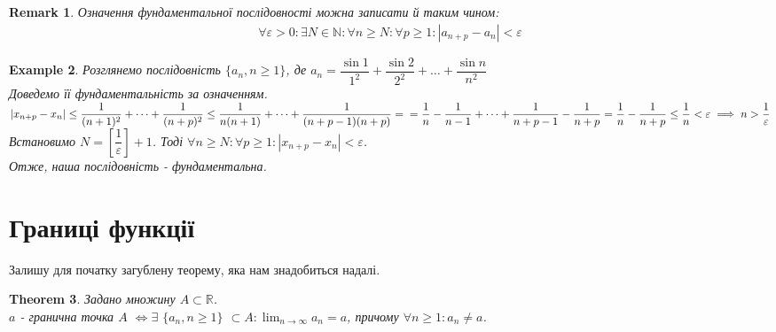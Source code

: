 \documentclass[a4paper, 14pt]{article}
\def\huge{\displaystyle}
\theoremstyle{theoremdd}
\newtheorem{theorem}{Theorem}[subsection]
\theoremstyle{theoremdd}
\theoremstyle{theoremdd}
\theoremstyle{theoremdd}
\newtheorem{example}[theorem]{Example}
\theoremstyle{theoremdd}
\theoremstyle{theoremdd}
\newtheorem{remark}[theorem]{Remark}
\theoremstyle{theoremdd}
\theoremstyle{theoremdd}
\begin{document}
	\begin{remark}
	Означення фундаментальної послідовності можна записати й таким чином:
	\begin{align*}
	\forall \varepsilon > 0: \exists N \in \mathbb{N}: \forall n \geq N: \forall p \geq 1: |a_{n+p} - a_n| < \varepsilon
	\end{align*}
	\end{remark}
	
	\begin{example}
	Розглянемо послідовність $\{a_n, n \geq 1\}$, де $a_n = \dfrac{\sin 1}{1^2} + \dfrac{\sin 2}{2^2} + \dots + \dfrac{\sin n}{n^2}$\\
	Доведемо її фундаментальність за означенням.\\
	$|x_{n+p} - x_n| \leq \dfrac{1}{(n+1)^2} + \dots + \dfrac{1}{(n+p)^2} \leq \dfrac{1}{n(n+1)} + \dots + \dfrac{1}{(n+p-1)(n+p)} = \\ = \dfrac{1}{n} - \dfrac{1}{n-1} + \dots + \dfrac{1}{n+p-1} - \dfrac{1}{n+p} = \dfrac{1}{n} - \dfrac{1}{n+p} \leq \dfrac{1}{n} < \varepsilon \implies n > \dfrac{1}{\varepsilon}$\\
	Встановимо $N = \left[ \dfrac{1}{\varepsilon} \right] + 1$. Тоді $\forall n \geq N: \forall p \geq 1: |x_{n+p} - x_n| < \varepsilon$.\\
	Отже, наша послідовність - фундаментальна.
	\end{example}
	\newpage
	
	
	\section{Границі функції}
	Залишу для початку загублену теорему, яка нам знадобиться надалі.
	\begin{theorem}
	Задано множину $A \subset \mathbb{R}$.\\
	$a$ - гранична точка $A$ $\iff \exists$ $\{a_n, n \geq 1\}$ $\subset A: \huge \lim_{n \to \infty} a_n = a$, причому $\forall n \geq 1: a_n \neq a$.
	\end{theorem}
	
\end{document}
